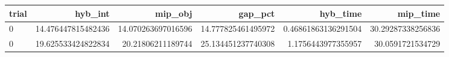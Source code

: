 \begin{tabular}{lrrrrr}
\hline
trial & hyb_int & mip_obj & gap_pct & hyb_time & mip_time \\ \hline
0 & 14.476447815482436 & 14.070263697016596 & 14.777825461495972 & 0.46861863136291504 & 30.29287338256836 \\
0 & 19.625533424822834 & 20.21806211189744 & 25.134451237740308 & 1.1756443977355957 & 30.0591721534729 \\
\hline
\end{tabular}
